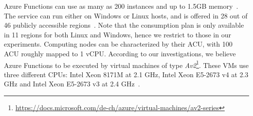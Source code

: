 Azure Functions can use as many as 200 instances and up to 1.5GB memory~\cite{AzureFunctionsPlans}. 
The service can run either on Windows or Linux hosts, and is offered in 28 out of 46 publicly accessible regions~\cite{AzureRegions}.
Note that the consumption plan is only available in 11 regions for both Linux and Windows, hence we restrict to those in our experiments.
Computing nodes can be characterized by their \gls{ACU}, with 100 ACU roughly mapped to 1 \gls{vCPU}.
According to our investigations, we believe Azure Functions to be executed by virtual machines of type \textit{Av2}\footnote{\url{https://docs.microsoft.com/de-ch/azure/virtual-machines/av2-series}}. 
These \gls{VM}s use three different \gls{CPU}s: Intel Xeon 8171M at 2.1 \gls{GHz}, Intel Xeon E5-2673 v4 at 2.3 \gls{GHz} and Intel Xeon E5-2673 v3 at 2.4 \gls{GHz}~\cite{AzureFunctionsVMs}.


